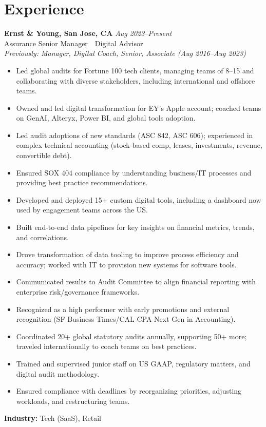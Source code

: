 \documentclass[10pt,a4paper]{article}
\begin{document}
\section*{Experience}
\textbf{Ernst \& Young, San Jose, CA} \hfill \textit{Aug 2023--Present}\\
Assurance Senior Manager \,\textbar\, Digital Advisor\\
\textit{Previously: Manager, Digital Coach, Senior, Associate (Aug 2016--Aug 2023)}
\begin{itemize}[leftmargin=*, itemsep=0.2em, topsep=0.2em]
    \item Led global audits for Fortune 100 tech clients, managing teams of 8--15 and collaborating with diverse stakeholders, including international and offshore teams.
    \item Owned and led digital transformation for EY's Apple account; coached teams on GenAI, Alteryx, Power BI, and global tools adoption.
    \item Led audit adoptions of new standards (ASC 842, ASC 606); experienced in complex technical accounting (stock-based comp, leases, investments, revenue, convertible debt).
    \item Ensured SOX 404 compliance by understanding business/IT processes and providing best practice recommendations.
    \item Developed and deployed 15+ custom digital tools, including a dashboard now used by engagement teams across the US.
    \item Built end-to-end data pipelines for key insights on financial metrics, trends, and correlations.
    \item Drove transformation of data tooling to improve process efficiency and accuracy; worked with IT to provision new systems for software tools.
    \item Communicated results to Audit Committee to align financial reporting with enterprise risk/governance frameworks.
    \item Recognized as a high performer with early promotions and external recognition (SF Business Times/CAL CPA Next Gen in Accounting).
    \item Coordinated 20+ global statutory audits annually, supporting 50+ more; traveled internationally to coach teams on best practices.
    \item Trained and supervised junior staff on US GAAP, regulatory matters, and digital audit methodology.
    \item Ensured compliance with deadlines by reorganizing priorities, adjusting workloads, and restructuring teams.
\end{itemize}
\textbf{Industry:} Tech (SaaS), Retail
\end{document}

